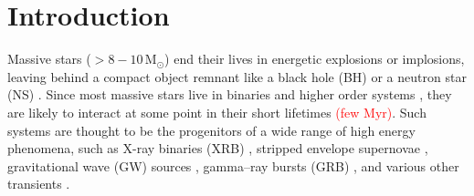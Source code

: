 \documentclass[linenumbers,trackchanges,twocolumn]{aastex701}
\newcommand{\Mdot}{\mathrm{M}_{\odot}}
\newcommand{\red}{\textcolor{red}}
\begin{document}
\section{Introduction}


Massive stars ($> 8-10\,\Mdot$) end their lives in energetic explosions or implosions, leaving behind a compact object remnant like a black hole (BH) or a neutron star (NS) \citep{2025arXiv250214836J}. Since most massive stars live in binaries and higher order systems \citep{2012Sci...337..444S,2017ApJS..230...15M, 2023ASPC..534..275O}, they are likely to interact at some point in their short lifetimes \red{(few $\mathrm{Myr}$)}. Such systems are thought to be the progenitors of a wide range of high energy phenomena, such as X-ray binaries (XRB) \citep{2006csxs.book..623T}, stripped envelope supernovae \citep{2011MNRAS.412.1522S,2016MNRAS.457..328L}, gravitational wave (GW) sources \citep{2017ApJ...846..170T, 2022PhR...955....1M, 2023PhRvX..13d1039A}, gamma--ray bursts (GRB) \citep{2007A&A...465L..29C}, and various other transients \citep{2012ApJ...752L...2C,2022ApJ...932...84M,2023MNRAS.523.6041G}. %
\end{document}
